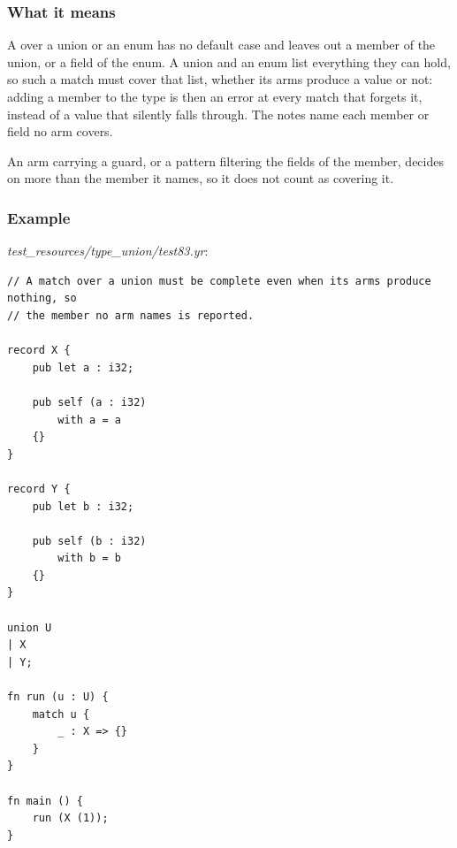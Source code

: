 \subsubsection*{What it means}

A  over a union or an enum has no default case and leaves out a member of the union, or a field of the enum. A union and an enum list everything they can hold, so such a match must cover that list, whether its arms produce a value or not: adding a member to the type is then an error at every match that forgets it, instead of a value that silently falls through. The notes name each member or field no arm covers.

An arm carrying a guard, or a pattern filtering the fields of the member, decides on more than the member it names, so it does not count as covering it.

\subsubsection*{Example}

\textit{test\_\allowbreak{}resources/\allowbreak{}type\_\allowbreak{}union/\allowbreak{}test83.yr}:

\begin{lstlisting}[style=coloredverbatimError]
// A match over a union must be complete even when its arms produce nothing, so
// the member no arm names is reported.

record X {
    pub let a : i32;

    pub self (a : i32)
        with a = a
    {}
}

record Y {
    pub let b : i32;

    pub self (b : i32)
        with b = b
    {}
}

union U
| X
| Y;

fn run (u : U) {
    match u {
        _ : X => {}
    }
}

fn main () {
    run (X (1));
}
\end{lstlisting}

